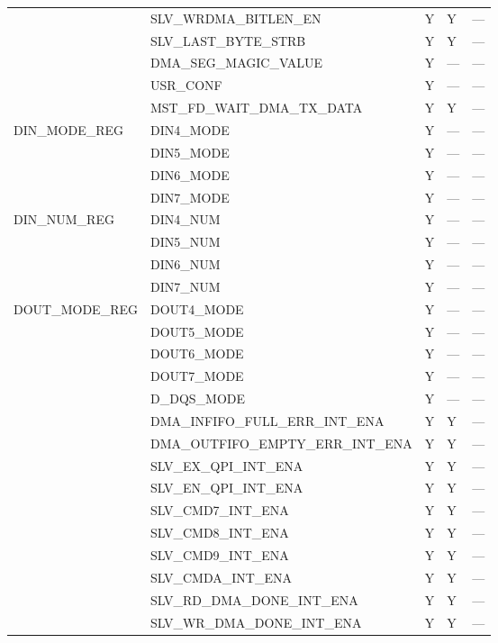 \documentclass[main\_\_EN.tex]{subfiles}
\begin{document}
\begin{longtable}{|p{4.0cm}|p{6.5cm}|p{1.5cm}|p{1.5cm}|p{1.5cm}|}
& SLV\_WRDMA\_BITLEN\_EN & Y & Y & --- \\ \cline{2-5}
& SLV\_LAST\_BYTE\_STRB & Y & Y & --- \\ \cline{2-5}
& DMA\_SEG\_MAGIC\_VALUE & Y & --- & --- \\ \cline{2-5}
& USR\_CONF & Y & --- & --- \\ \cline{2-5}
& MST\_FD\_WAIT\_DMA\_TX\_DATA & Y & Y & --- \\ \hline
\multirow{4}{*}{DIN\_MODE\_REG} & DIN4\_MODE & Y & --- & --- \\ \cline{2-5}
& DIN5\_MODE & Y & --- & --- \\ \cline{2-5}
& DIN6\_MODE & Y & --- & --- \\ \cline{2-5}
& DIN7\_MODE & Y & --- & --- \\ \hline
\multirow{4}{*}{DIN\_NUM\_REG} & DIN4\_NUM & Y & --- & --- \\ \cline{2-5}
& DIN5\_NUM & Y & --- & --- \\ \cline{2-5}
& DIN6\_NUM & Y & --- & --- \\ \cline{2-5}
& DIN7\_NUM & Y & --- & --- \\ \hline
\multirow{5}{*}{DOUT\_MODE\_REG} & DOUT4\_MODE & Y & --- & --- \\ \cline{2-5}
& DOUT5\_MODE & Y & --- & --- \\ \cline{2-5}
& DOUT6\_MODE & Y & --- & --- \\ \cline{2-5}
& DOUT7\_MODE & Y & --- & --- \\ \cline{2-5}
& D\_DQS\_MODE & Y & --- & --- \\ \hline
\clearpage
\multirow{13}{*}{DMA\_INT\_ENA\_REG} & DMA\_INFIFO\_FULL\_ERR\_INT\_ENA & Y & Y & --- \\ \cline{2-5}
& DMA\_OUTFIFO\_EMPTY\_ERR\_INT\_ENA & Y & Y & --- \\ \cline{2-5}
& SLV\_EX\_QPI\_INT\_ENA & Y & Y & --- \\ \cline{2-5}
& SLV\_EN\_QPI\_INT\_ENA & Y & Y & --- \\ \cline{2-5}
& SLV\_CMD7\_INT\_ENA & Y & Y & --- \\ \cline{2-5}
& SLV\_CMD8\_INT\_ENA & Y & Y & --- \\ \cline{2-5}
& SLV\_CMD9\_INT\_ENA & Y & Y & --- \\ \cline{2-5}
& SLV\_CMDA\_INT\_ENA & Y & Y & --- \\ \cline{2-5}
& SLV\_RD\_DMA\_DONE\_INT\_ENA & Y & Y & --- \\ \cline{2-5}
& SLV\_WR\_DMA\_DONE\_INT\_ENA & Y & Y & --- \\ \cline{2-5}

\end{longtable}
\end{document}

